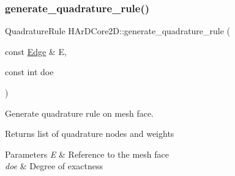 \subsubsection{\texorpdfstring{generate\+\_\+quadrature\+\_\+rule()}{generate\_quadrature\_rule()}\hspace{0.1cm}{\footnotesize\ttfamily [2/2]}}
{\footnotesize\ttfamily Quadrature\+Rule H\+Ar\+D\+Core2\+D\+::generate\+\_\+quadrature\+\_\+rule (\begin{DoxyParamCaption}\item[{const \hyperlink{classHArDCore2D_1_1Edge}{Edge} \&}]{E,  }\item[{const int}]{doe }\end{DoxyParamCaption})}



Generate quadrature rule on mesh face. 

\begin{DoxyReturn}{Returns}
list of quadrature nodes and weights 
\end{DoxyReturn}

\begin{DoxyParams}{Parameters}
{\em E} & Reference to the mesh face \\
\hline
{\em doe} & Degree of exactness \\
\hline
\end{DoxyParams}
